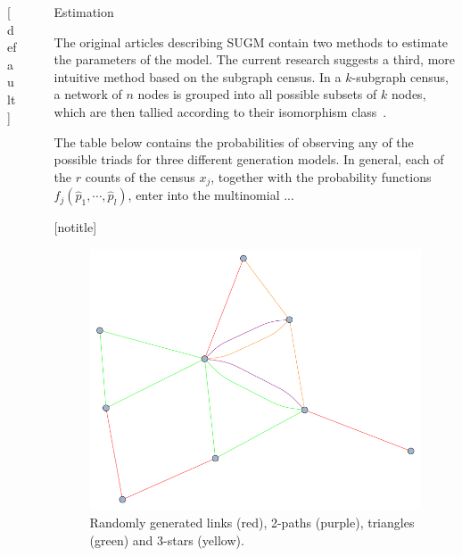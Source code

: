 \documentclass[final]{beamer}
\newlength{\sepwid}
\newlength{\onecolwid}
\newlength{\threecolwid}
\begin{document}
\begin{frame}[t]
\begin{columns}[t]
\begin{column}{\threecolwid}
\begin{columns}[t,totalwidth=\threecolwid]
\begin{column}{\onecolwid}
\begin{block}
\end{block}
[default]

\end{column} %

\begin{column}{\sepwid}\end{column} %

\begin{column}{\onecolwid}\vspace{-.6in} %

\begin{block}{Estimation}

The original articles describing SUGM contain two methods to estimate the parameters of the model. The current research suggests a third, more intuitive method based on the subgraph census. In a $k$-subgraph census, a network of $n$ nodes is grouped into all possible subsets of $k$ nodes, which are then tallied according to their isomorphism class~\cite{Davis1972,Holland1970,Holland1976}.

The table below contains the probabilities of observing any of the possible triads for three different generation models. In general, each of the $r$ counts of the census $x_{j}$, together with the probability functions $f_{j}(\hat{p}_{1},\cdots,\hat{p}_{l})$, enter into the multinomial ...

\end{block}

[notitle]
\begin{block}

\begin{figure}
\includegraphics[width=0.8\linewidth]{../Figure02_2.pdf}
\caption{Randomly generated links (red), 2-paths (purple), triangles (green) and 3-stars (yellow).}
\label{fig:Figure02}
\end{figure}


\end{block}
\end{column}
\end{columns}
\end{column}
\end{columns}
\end{frame}
\end{document}
